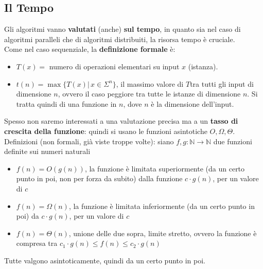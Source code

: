 \newpage

\subsection*{Il Tempo}

Gli algoritmi vanno \textbf{valutati} (anche) \textbf{sul tempo}, in quanto sia nel caso di algoritmi paralleli che di algoritmi distribuiti, la risorsa tempo è cruciale.\\

Come nel caso sequenziale, la \textbf{definizione formale} è:
\begin{itemize}
	\item $T(x) =$ numero di operazioni elementari su input $x$ (istanza). \\
	
	\item $t(n) = \max \{T(x) | \, x \in \Sigma^n \}$, il massimo valore di $T$tra tutti gli input di dimensione $n$, ovvero il caso peggiore tra tutte le istanze di dimensione $n$. Si tratta quindi di una funzione in $n$, dove $n$ è la dimensione dell'input.\\
\end{itemize}

Spesso non saremo interessati a una valutazione precisa ma a un \textbf{tasso di crescita della funzione}: quindi si usano le funzioni asintotiche $O, \Omega, \Theta$.\\

Definizioni (non formali, già viste troppe volte): siano $f,g: \mathbb{N} \rightarrow \mathbb{N}$ due funzioni definite sui numeri naturali
\begin{itemize}
	\item $f(n) = O(g(n))$, la funzione è limitata superiormente (da un certo punto in poi, non per forza da subito) dalla funzione $c \cdot g(n)$, per un valore di $c$
	
	\item $f(n) = \Omega (n)$, la funzione è limitata inferiormente (da un certo punto in poi) da $c \cdot g(n)$, per un valore di $c$
	
	\item $f(n) = \Theta(n)$, unione delle due sopra, limite stretto, ovvero la funzione è compresa tra $c_1 \cdot g(n) \leq f(n) \leq c_2 \cdot g(n)$
\end{itemize}
Tutte valgono asintoticamente, quindi da un certo punto in poi.\\

